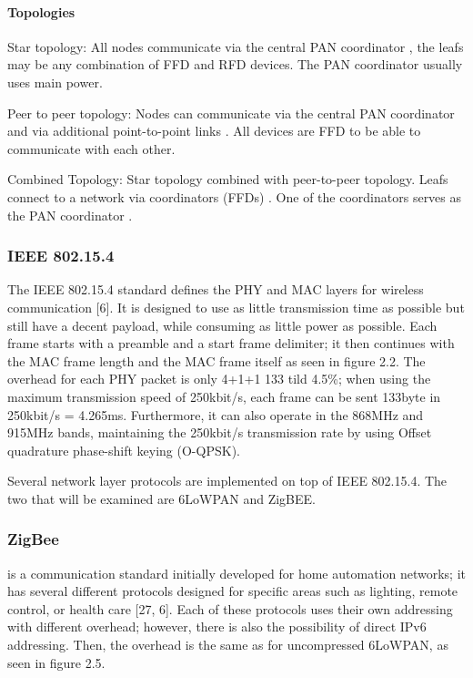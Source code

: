 \paragraph{Topologies}
Star topology:
	All nodes communicate via the central PAN coordinator ,
	the leafs may be any combination of FFD and RFD devices.
The PAN coordinator usually uses main power.

Peer to peer topology:
	Nodes can communicate via the central PAN coordinator and via additional point-to-point links .
All devices are FFD to be able to communicate with each other.


Combined Topology:
	Star topology combined with peer-to-peer topology.
Leafs connect to a network via coordinators (FFDs) .
One of the coordinators serves as the PAN coordinator .



\subsubsection*{IEEE 802.15.4}
The IEEE 802.15.4 standard defines the PHY and MAC layers for wireless communication [6].
It is designed to use as little transmission time as possible but still have a decent payload,
	while consuming as little power as possible.
Each frame starts with a preamble and a start frame delimiter;
	it then continues with the MAC frame length and the MAC frame itself as seen in figure 2.2.
The overhead for each PHY packet is only 4+1+1 133 tild 4.5\%;
	when
using the maximum transmission speed of 250kbit/s,
	each frame can be sent 133byte in 250kbit/s = 4.265ms.
Furthermore,
	it can also operate in the 868MHz and 915MHz bands,
	maintaining the 250kbit/s transmission rate by using Offset quadrature phase-shift keying (O-QPSK).

Several network layer protocols are implemented on top of IEEE 802.15.4.
The two that will be examined are 6LoWPAN and ZigBEE.

\subsubsection{ZigBee} 
is a communication standard initially developed for home automation
networks; it has several different protocols designed for specific areas such
as lighting, remote control, or health care [27, 6]. Each of these protocols
uses their own addressing with different overhead; however, there is also the
possibility of direct IPv6 addressing. Then, the overhead is the same as for
uncompressed 6LoWPAN, as seen in figure 2.5.

